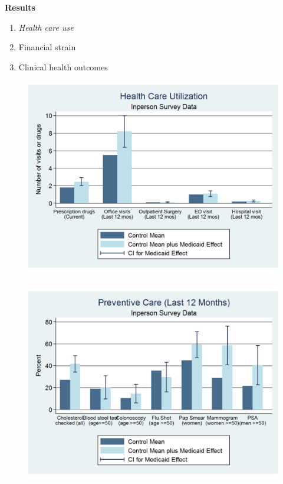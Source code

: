 \documentclass[notes=show]{beamer}
\begin{document}
\begin{frame}[plain]
	\begin{center}
	\textbf{Results}
	\end{center}
	
	\begin{enumerate}
	\item \emph{Health care use}
	\item Financial strain
	\item Clinical health outcomes
	\end{enumerate}
	
\end{frame}

\begin{frame}[plain]
	
	\begin{figure}
	\includegraphics[scale=0.40]{./lecture_includes/baicker_11.pdf}
	\end{figure}
\end{frame}

\begin{frame}[plain]
	
	\begin{figure}
	\includegraphics[scale=0.40]{./lecture_includes/baicker_12.pdf}
	\end{figure}
\end{frame}
		
\end{document}
